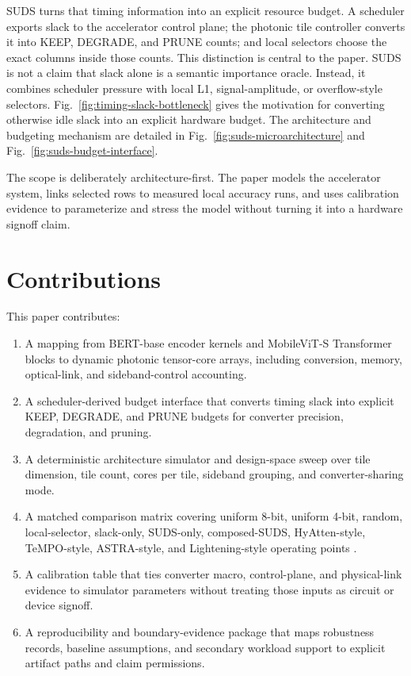 \documentclass[10pt,journal]{IEEEtran}
\begin{document}
SUDS turns that timing information into an explicit resource budget. A
scheduler exports slack to the accelerator control plane; the photonic tile
controller converts it into KEEP, DEGRADE, and PRUNE counts; and local selectors
choose the exact columns inside those counts. This distinction is central to
the paper. SUDS is not a claim that slack alone is a semantic importance
oracle. Instead, it combines scheduler pressure with local L1,
signal-amplitude, or overflow-style selectors.
Fig.~\ref{fig:timing-slack-bottleneck} gives the motivation for converting
otherwise idle slack into an explicit hardware budget. The architecture and
budgeting mechanism are detailed in Fig.~\ref{fig:suds-microarchitecture} and
Fig.~\ref{fig:suds-budget-interface}.

The scope is deliberately architecture-first. The paper models the accelerator
system, links selected rows to measured local accuracy runs, and uses
calibration evidence to parameterize and stress the model without turning it
into a hardware signoff claim.

\section{Contributions}

This paper contributes:

\begin{enumerate}
  \item A mapping from BERT-base encoder kernels and MobileViT-S Transformer
  blocks to dynamic photonic tensor-core arrays, including conversion, memory,
  optical-link, and sideband-control accounting.
  \item A scheduler-derived budget interface that converts timing slack into
  explicit KEEP, DEGRADE, and PRUNE budgets for converter precision,
  degradation, and pruning.
  \item A deterministic architecture simulator and design-space sweep over
  tile dimension, tile count, cores per tile, sideband grouping, and
  converter-sharing mode.
  \item A matched comparison matrix covering uniform 8-bit, uniform 4-bit,
  random, local-selector, slack-only, SUDS-only, composed-SUDS, HyAtten-style,
  TeMPO-style, ASTRA-style, and Lightening-style operating points
  \cite{tempo2024,astra2025}.
  \item A calibration table that ties converter macro, control-plane, and
  physical-link evidence to simulator parameters without treating those inputs
  as circuit or device signoff.
  \item A reproducibility and boundary-evidence package that maps robustness
  records, baseline assumptions, and secondary workload support to explicit
  artifact paths and claim permissions.
\end{enumerate}
\end{document}
